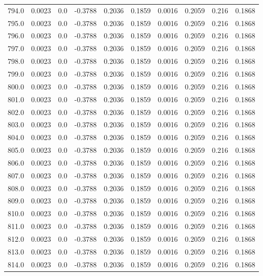 \begin{longtable}{lrrrrrrrrr}
794.0 & 0.0023 & 0.0 & -0.3788 & 0.2036 & 0.1859 & 0.0016 & 0.2059 & 0.216 & 0.1868 \\
795.0 & 0.0023 & 0.0 & -0.3788 & 0.2036 & 0.1859 & 0.0016 & 0.2059 & 0.216 & 0.1868 \\
796.0 & 0.0023 & 0.0 & -0.3788 & 0.2036 & 0.1859 & 0.0016 & 0.2059 & 0.216 & 0.1868 \\
797.0 & 0.0023 & 0.0 & -0.3788 & 0.2036 & 0.1859 & 0.0016 & 0.2059 & 0.216 & 0.1868 \\
798.0 & 0.0023 & 0.0 & -0.3788 & 0.2036 & 0.1859 & 0.0016 & 0.2059 & 0.216 & 0.1868 \\
799.0 & 0.0023 & 0.0 & -0.3788 & 0.2036 & 0.1859 & 0.0016 & 0.2059 & 0.216 & 0.1868 \\
800.0 & 0.0023 & 0.0 & -0.3788 & 0.2036 & 0.1859 & 0.0016 & 0.2059 & 0.216 & 0.1868 \\
801.0 & 0.0023 & 0.0 & -0.3788 & 0.2036 & 0.1859 & 0.0016 & 0.2059 & 0.216 & 0.1868 \\
802.0 & 0.0023 & 0.0 & -0.3788 & 0.2036 & 0.1859 & 0.0016 & 0.2059 & 0.216 & 0.1868 \\
803.0 & 0.0023 & 0.0 & -0.3788 & 0.2036 & 0.1859 & 0.0016 & 0.2059 & 0.216 & 0.1868 \\
804.0 & 0.0023 & 0.0 & -0.3788 & 0.2036 & 0.1859 & 0.0016 & 0.2059 & 0.216 & 0.1868 \\
805.0 & 0.0023 & 0.0 & -0.3788 & 0.2036 & 0.1859 & 0.0016 & 0.2059 & 0.216 & 0.1868 \\
806.0 & 0.0023 & 0.0 & -0.3788 & 0.2036 & 0.1859 & 0.0016 & 0.2059 & 0.216 & 0.1868 \\
807.0 & 0.0023 & 0.0 & -0.3788 & 0.2036 & 0.1859 & 0.0016 & 0.2059 & 0.216 & 0.1868 \\
808.0 & 0.0023 & 0.0 & -0.3788 & 0.2036 & 0.1859 & 0.0016 & 0.2059 & 0.216 & 0.1868 \\
809.0 & 0.0023 & 0.0 & -0.3788 & 0.2036 & 0.1859 & 0.0016 & 0.2059 & 0.216 & 0.1868 \\
810.0 & 0.0023 & 0.0 & -0.3788 & 0.2036 & 0.1859 & 0.0016 & 0.2059 & 0.216 & 0.1868 \\
811.0 & 0.0023 & 0.0 & -0.3788 & 0.2036 & 0.1859 & 0.0016 & 0.2059 & 0.216 & 0.1868 \\
812.0 & 0.0023 & 0.0 & -0.3788 & 0.2036 & 0.1859 & 0.0016 & 0.2059 & 0.216 & 0.1868 \\
813.0 & 0.0023 & 0.0 & -0.3788 & 0.2036 & 0.1859 & 0.0016 & 0.2059 & 0.216 & 0.1868 \\
814.0 & 0.0023 & 0.0 & -0.3788 & 0.2036 & 0.1859 & 0.0016 & 0.2059 & 0.216 & 0.1868 \\

\end{longtable}
